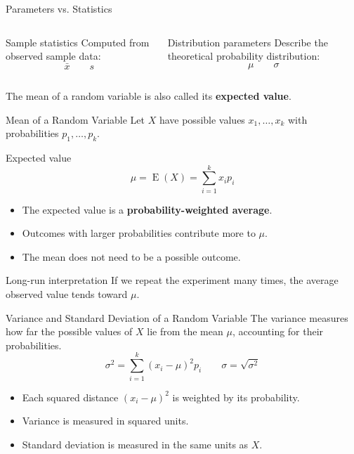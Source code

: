 \documentclass[aspectratio=169]{beamer}
\newcommand{\E}{\operatorname{E}}
\begin{document}
\begin{frame}{Parameters vs. Statistics}
\begin{columns}[T,onlytextwidth]
\begin{block}{Sample statistics}
Computed from observed sample data:
\[
\bar{x} \qquad s
\]
\end{block}

\begin{block}{Distribution parameters}
Describe the theoretical probability distribution:
\[
\mu \qquad \sigma 
\]
\end{block}
\end{columns}

\vspace{0.4cm}
The mean of a random variable is also called its \textbf{expected value}.
\end{frame}

\begin{frame}{Mean of a Random Variable}
Let $X$ have possible values $x_1,\ldots,x_k$ with probabilities $p_1,\ldots,p_k$.
\begin{block}{Expected value}
$$\mu=\E(X)=\sum_{i=1}^{k}x_i p_i$$
\end{block}
\begin{itemize}
	\item The expected value is a \textbf{probability-weighted average}.
	\item Outcomes with larger probabilities contribute more to $\mu$.
	\item The mean does not need to be a possible outcome.
\end{itemize}
\begin{block}{Long-run interpretation}
If we repeat the experiment many times, the average observed value tends toward $\mu$.
\end{block}
\end{frame}

\begin{frame}{Variance and Standard Deviation of a Random Variable}
The variance measures how far the possible values of $X$ lie from the mean $\mu$, accounting for their probabilities.
$$\sigma^2=\sum_{i=1}^{k}(x_i-\mu)^2p_i \qquad \sigma=\sqrt{\sigma^2}$$
\begin{itemize}
	 \item Each squared distance $(x_i-\mu)^2$ is weighted by its probability.
	 \item Variance is measured in squared units.
	 \item Standard deviation is measured in the same units as $X$.
\end{itemize}
\end{frame}
\end{document}
